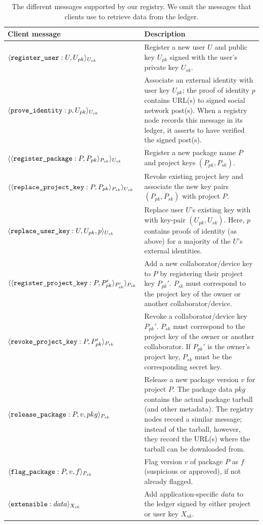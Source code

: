 \begin{table}[ht!]
  \caption[The different messages supported by our registry]{
    The different messages supported by our registry.
    We omit the messages that clients use to retrieve data from the ledger.
  }
\label{fig:messages}
\centering
\small
\begin{tabularx}{\textwidth}{lX}
\toprule
\textbf{Client message}   & \textbf{Description} \\
\midrule
$\langle\texttt{register\_user}: U, U_{pk} \rangle_{U_{sk}}$ &
  Register a new user $U$ and public key $U_{pk}$ signed with the user's private key $U_{sk}$.\\
$\langle\texttt{prove\_identity}: p, U_{pk}\rangle_{U_{sk}}$  &
  Associate an external identity with user key $U_{pk}$; the proof of identity
  $p$ contains URL(s) to signed social network post(s).  When a registry node
  records this message in its ledger, it asserts to have verified the
  signed post(s).\\
$\langle\langle\texttt{register\_package}: P, P_{pk}\rangle_{P_{sk}}\rangle_{U_{sk}}$        &
  Register a new package name $P$ and project keys $(P_{pk}, P_{sk})$.\\
$\langle\langle\texttt{replace\_project\_key}: P, P_{pk}\rangle_{P_{sk}}\rangle_{U_{sk}}$        &
  Revoke existing project key and associate the
  new key pairs $(P_{pk}, P_{sk})$ with project $P$.\\
$\langle\texttt{replace\_user\_key}: U, U_{pk}, p\rangle_{U_{sk}}$ &
  Replace user $U$'s existing key with with key-pair $(U_{pk}, U_{sk})$.
  Here, $p$ contains proofs of identity (as above) for a majority of the $U$'s
  external identities.\\
\midrule
  $\langle\langle\texttt{register\_project\_key}: P, P_{pk}'\rangle_{P_{sk}'}\rangle_{P_{sk}}$ &
  Add a new collaborator/device key to $P$ by registering their project key $P_{pk}'$.
  $P_{sk}$ must correspond to the project key of the owner or another
  collaborator/device.\\
$\langle\texttt{revoke\_project\_key}: P, P_{pk}'\rangle_{P_{sk}}$ &
  Revoke a collaborator/device key $P_{pk}'$.
  $P_{sk}$ must correspond to the project key of the owner or another collaborator.
  If $P_{pk}'$ is the owner's project key, $P_{sk}$ must be the
  corresponding secret key.\\
$\langle\texttt{release\_package}: P, v, pkg\rangle_{P_{sk}}$&
  Release a new package version $v$ for project $P$. The package data $pkg$
  contains the actual package tarball (and other metadata). The registry nodes
  record a similar message; instead of the tarball, however, they record the
  URL(s) where the tarball can be downloaded from.\\
$\langle\texttt{flag\_package}: P, v, f\rangle_{P_{sk}}$&
  Flag version $v$ of package $P$ as $f$ (suspicious or approved), if 
  not already flagged.\\
\midrule
$\langle\texttt{extensible}: data\rangle_{X_{sk}}$  &
  Add application-specific $data$ to the ledger signed by either project
  or user key $X_{sk}$.\\
\bottomrule
\end{tabularx}
\end{table}
